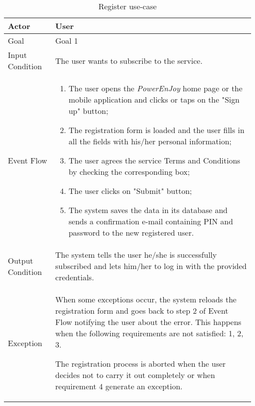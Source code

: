 \begin{table}[H]
\begin{center}
\begin{tabular}{p{} | p{}}
\hline
Actor & User\\
\hline
Goal & Goal 1\\
\hline
Input Condition & The user wants to subscribe to the service.\\
\hline
Event Flow & 
\begin{enumerate}
\item The user opens the \emph{PowerEnJoy} home page or the mobile application and clicks or taps on the "Sign up" button;
\item The registration form is loaded and the user fills in all the fields with his/her personal information;
\item The user agrees the service Terms and Conditions by checking the corresponding box;
\item The user clicks on "Submit" button;
\item The system saves the data in its database and sends a confirmation e-mail containing PIN and password to the new registered user.
\end{enumerate} \\
\hline
Output Condition & The system tells the user he/she is successfully subscribed and lets him/her to log in with the provided credentials.\\
\hline
Exception & When some exceptions occur, the system reloads the registration form and goes back to step 2 of Event Flow notifying the user about the error. This happens when the following requirements are not satisfied: 1, 2, 3.

The registration process is aborted when the user decides not to carry it out completely or when requirement 4 generate an exception.\\
\hline
\end{tabular}
\end{center}
\caption{Register use-case}
\label{login_uc}
\end{table}

